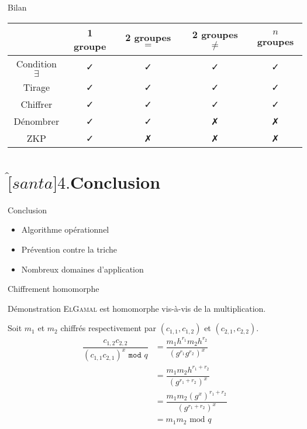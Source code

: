 \documentclass[10pt, compress]{beamer}
\begin{document}
  \begin{frame}{Bilan}
    \begin{table}
      \begin{tabular}{@{}c|cccc@{}}
        \cmidrule(l){2-5}
                            & 1 groupe         & 2 groupes $=$    & 2 groupes $\neq$ & $n$ groupes      \\ \midrule
        Condition $\exists$ & \alert{\faCheck} & \alert{\faCheck} & \alert{\faCheck} & \alert{\faCheck} \\
        Tirage              & \alert{\faCheck} & \alert{\faCheck} & \alert{\faCheck} & \alert{\faCheck} \\
        Chiffrer            & \alert{\faCheck} & \alert{\faCheck} & \alert{\faCheck} & \alert{\faCheck} \\
        Dénombrer           & \alert{\faCheck} & \alert{\faCheck} & \faClose         & \faClose         \\
        ZKP                 & \alert{\faCheck} & \faClose         & \faClose         & \faClose         \\ \bottomrule
        \end{tabular}
    \end{table}
  \end{frame}

\section{$\hat[santa]{\text{4.}}$\quad Conclusion}

  \begin{frame}{Conclusion}
    \begin{itemize}
      \item \alert{Algorithme} opérationnel
      \item Prévention contre la \alert{triche}
      \item Nombreux domaines d'\alert{application}
    \end{itemize}
  \end{frame}

\appendix
{}

  \begin{frame}{Chiffrement homomorphe}
    \begin{exampleblock}{Démonstration}
      \textsc{ElGamal} est homomorphe vis-à-vis de la multiplication.
    \end{exampleblock}
    Soit $m_1$ et $m_2$ chiffrés respectivement par $(c_{1, 1}, c_{1, 2})$ et $(c_{2, 1}, c_{2, 2})$.
    \begin{align*}
      \dfrac{c_{1, 2} c_{2, 2}}{(c_{1, 1} c_{2, 1})^x\texttt{ mod }q}
      &= \dfrac{m_1 h^{r_1} m_2  h^{r_2}}{(g^{r_1} g^{r_2})^x} \\
      &= \dfrac{m_1m_2 h^{r_1+r_2}}{(g^{r_1+r_2})^x} \\
      &= \dfrac{m_1m_2(g^x)^{r_1+r_2}}{(g^{r_1+r_2})^x} \\
      &= m_1m_2\text{ mod }q
    \end{align*}
  \end{frame}
\end{document}

